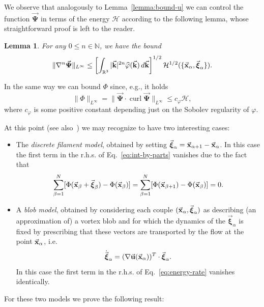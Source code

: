 \documentclass[a4paper,11pt]{article}
\numberwithin{equation}{section}
\DeclareMathOperator{\curl}{curl}
\newtheorem{lemma}{Lemma}
\newcommand{\R}{\mathbb{R}}
\newcommand{\N}{\mathbb{N}}
\newcommand{\U}{\mbox{$\vec{\bf u}$}}
\newcommand{\vPsi}{\mbox{$\vec{\boldsymbol \Psi}$}}
\renewcommand{\k}{\mbox{$\vec{\bf k}$}}
\newcommand{\x}{\mbox{$\vec{\bf x}$}}
\newcommand{\bxi}{\mbox{$\vec{\boldsymbol \xi}$}}
\begin{document}
%
We observe that analogously to Lemma~\ref{lemma:bound-u} we
can control the function $\vPsi$ in terms of the energy $\mathcal{H}$
according to the following lemma, whose straightforward proof is left
to the reader.  
\begin{lemma}
\label{lemma:bound-psi}  
For any $0\le n \in\N$, we have the bound
\begin{equation*}
\|\nabla^n \vPsi\|_{L^\infty} \le \left[\int_{\R^3} |\k|^{2n}
  \widehat\varphi(\k) \,d\k \right]^{1/2} \mathcal{H}^{1/2}
(\{\x_\alpha,\bxi_\alpha\}).  
\end{equation*}
\end{lemma}

\vspace{.3cm}
\noindent In the same way we can bound $\Phi$ since, e.g., it holds
\begin{equation*}
 \|\Phi\|_{L^\infty} =  \|\vPsi \cdot \curl \vPsi\|_{L^\infty} 
\le c_\varphi \mathcal{H},    
\end{equation*}
where $c_\varphi$ is some positive constant depending just on the
Sobolev regularity  of $\varphi$.\par   
%
At this point (see also~\cite{MR95m:76043}) we may recognize to have
two interesting cases: 
\begin{itemize}
\item[A)] The \emph{discrete filament model}, obtained by setting
  $\bxi_\alpha = \x_{\alpha+1}-\x_\alpha$. In this case the first term
  in the r.h.s. of  Eq.~\eqref{eq:int-by-parts} vanishes due to the
  fact that
$$
\sum_{\beta=1}^N [\Phi(\x_\beta+\bxi_\beta) -
  \Phi(\x_\beta)]=\sum_{\beta=1}^N [\Phi(\x_{\beta+1}) -
  \Phi(\x_\beta)] = 0. 
$$  
\item[B)] A \emph{blob model}, obtained by considering each couple
  $(\x_\alpha, \bxi_\alpha)$ as describing (an approximation of) a 
vortex blob and for which the dynamics of the $\bxi_\alpha$ is fixed
by prescribing that these vectors are transported by the flow at the
point $\x_\alpha$, i.e.
\begin{equation*}%
\dot{\bxi}_\alpha = (\nabla \U(\x_\alpha))^T \cdot\bxi_\alpha.
\end{equation*}
In this case the first term in the r.h.s. of
Eq.~\eqref{eq:energy-rate} vanishes identically.  
\end{itemize}
%
For these two models we prove the following result:
\end{document}
